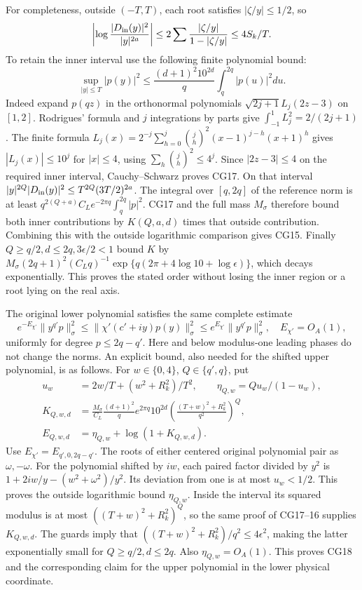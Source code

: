 \documentclass[11pt]{article}
\begin{document}
For completeness, outside \((-T,T)\), each root satisfies \(|\zeta/y|\le1/2\), so \[
\left|\log\frac{|D_{\rm in}(y)|^2}{|y|^{2a}}\right|
\le 2\sum\frac{|\zeta/y|}{1-|\zeta/y|}\le4S_k/T.
\] To retain the inner interval use the following finite polynomial bound: \[
\sup_{|y|\le T}|p(y)|^2
\le\frac{(d+1)^2 10^{2d}}q\int_q^{2q}|p(u)|^2du.
\tag{CG17}
\] Indeed expand \(p(qz)\) in the orthonormal polynomials \(\sqrt{2j+1}L_j(2z-3)\) on \([1,2]\). Rodrigues' formula and \(j\) integrations by parts give \(\int_{-1}^1L_j^2=2/(2j+1)\). The finite formula \(L_j(x)=2^{-j}\sum_{h=0}^j\binom jh^2(x-1)^{j-h}(x+1)^h\) gives \(|L_j(x)|\le10^j\) for \(|x|\le4\), using \(\sum_h\binom jh^2\le4^j\). Since \(|2z-3|\le4\) on the required inner interval, Cauchy--Schwarz proves CG17. On that interval \(|y|^{2Q}|D_{\rm in}(y)|^2\le T^{2Q}(3T/2)^{2a}\). The integral over \([q,2q]\) of the reference norm is at least \(q^{2(Q+a)}C_Le^{-2\pi q}\int_q^{2q}|p|^2\). CG17 and the full mass \(M_\sigma\) therefore bound both inner contributions by \(K(Q,a,d)\) times that outside contribution. Combining this with the outside logarithmic comparison gives CG15. Finally \(Q\ge q/2,d\le2q,3\epsilon/2<1\) bound \(K\) by \(M_\sigma(2q+1)^2(C_Lq)^{-1}
 \exp\{q(2\pi+4\log10+\log\epsilon)\}\), which decays exponentially. This proves the stated order without losing the inner region or a root lying on the real axis.

The original lower polynomial satisfies the same complete estimate \[
e^{-E_{\chi'}}\|y^{q'}p\|_\sigma^2
\le\|\chi'(c'+iy)p(y)\|_\sigma^2
\le e^{E_{\chi'}}\|y^{q'}p\|_\sigma^2,
\quad E_{\chi'}=O_A(1),
\tag{CG18}
\] uniformly for degree \(p\le2q-q'\). Here and below modulus-one leading phases do not change the norms. An explicit bound, also needed for the shifted upper polynomial, is as follows. For \(w\in\{0,4\}\), \(Q\in\{q',q\}\), put \[
\begin{split}
u_w&=2w/T+(w^2+R_k^2)/T^2,\qquad
\eta_{Q,w}=Qu_w/(1-u_w),\\
K_{Q,w,d}&=\frac{M_\sigma}{C_L}\frac{(d+1)^2}{q}
e^{2\pi q}10^{2d}
\left(\frac{(T+w)^2+R_k^2}{q^2}\right)^Q,\\
E_{Q,w,d}&=\eta_{Q,w}+\log(1+K_{Q,w,d}).
\end{split}\tag{CG19}
\] Use \(E_{\chi'}=E_{q',0,2q-q'}\). The roots of either centered original polynomial pair as \(\omega,-\omega\). For the polynomial shifted by \(iw\), each paired factor divided by \(y^2\) is \(1+2iw/y-(w^2+\omega^2)/y^2\). Its deviation from one is at most \(u_w<1/2\). This proves the outside logarithmic bound \(\eta_{Q,w}\). Inside the interval its squared modulus is at most \(((T+w)^2+R_k^2)^Q\), so the same proof of CG17--16 supplies \(K_{Q,w,d}\). The guards imply that \(((T+w)^2+R_k^2)/q^2\le4\epsilon^2\), making the latter exponentially small for \(Q\ge q/2,d\le2q\). Also \(\eta_{Q,w}=O_A(1)\). This proves CG18 and the corresponding claim for the upper polynomial in the lower physical coordinate.
\end{document}
